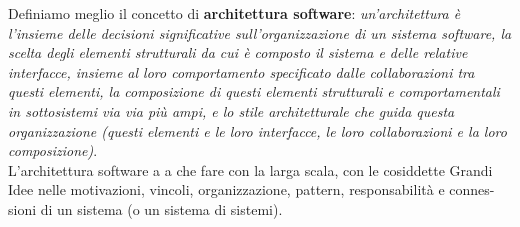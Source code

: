 \documentclass[a4paper,12pt, oneside]{book}
\begin{document}
Definiamo meglio il concetto di \textbf{architettura software}: \textit{un'architettura è l'insieme delle decisioni significative sull'organizzazione
di un sistema software, la scelta degli elementi strutturali da cui è composto
il sistema e delle relative interfacce, insieme al loro comportamento
specificato dalle collaborazioni tra questi elementi, la composizione di questi
elementi strutturali e comportamentali in sottosistemi via via più ampi, e
lo stile architetturale che guida questa organizzazione (questi elementi e le
loro interfacce, le loro collaborazioni e la loro composizione)}.\\
L'architettura software a a che fare con la larga scala, con le cosiddette
Grandi Idee nelle motivazioni, vincoli, organizzazione, pattern, responsabilità e connes-
sioni di un sistema (o un sistema di sistemi).\\
\end{document}
